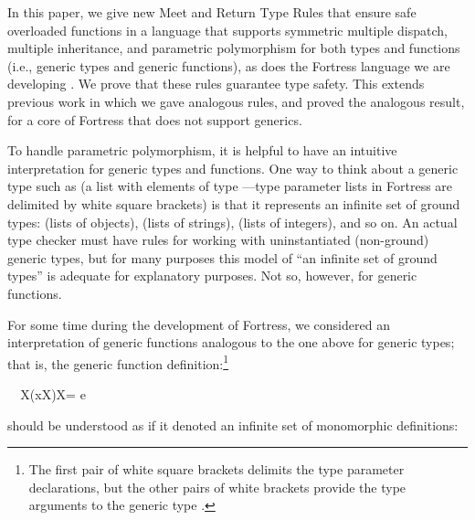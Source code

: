 \documentclass[10pt]{sigplanconf}
\newcommand{\TODO}[1]{\textbf{\emph{\textcolor{red}{TODO}}}: \textsf{\footnotesize #1}}
\begin{document}
In this paper, 
we give new Meet and Return Type Rules 
that ensure safe overloaded functions 
in a language that supports symmetric multiple dispatch, 
multiple inheritance, 
and parametric polymorphism for both types and functions
(i.e., generic types and generic functions), 
as does the Fortress language we are developing \cite{Fortress}.
We prove that these rules guarantee type safety.
This extends previous work \cite{allen07} 
in which we gave analogous rules, 
and proved the analogous result,
for a core of Fortress that does not support generics.



To handle parametric polymorphism,
it is helpful to have an intuitive interpretation for generic types and functions.
One way to think about a generic type such as 
(a list with elements of type ---type parameter lists 
in Fortress are delimited by white square brackets) 
is that it represents an infinite set of ground types: 
 (lists of objects),
 (lists of strings), 
 (lists of integers), 
and so on.
An actual type checker must have rules 
for working with uninstantiated (non-ground) generic types, 
but for many purposes this model of ``an infinite set of ground types'' 
is adequate for explanatory purposes.
Not so, however, for generic functions.  

For some time during the development of Fortress, 
we considered 
an interpretation of generic functions
analogous to the one above for generic types;
that is, 
the generic function definition:\footnote{%
The first pair of white square brackets 
delimits the type parameter declarations, 
but the other pairs of white brackets 
provide the type arguments to the generic type .}

\small
\begin{FortressCode}
{\tt ~~}\+\llbracket{}X\rrbracket\bigl(x\COLON {}\llbracket{}X\rrbracket\bigr)\COLON {}\llbracket{}X\rrbracket = e\-
\end{FortressCode}
\normalsize
should be understood as if it denoted an infinite set of monomorphic definitions:
\end{document}

